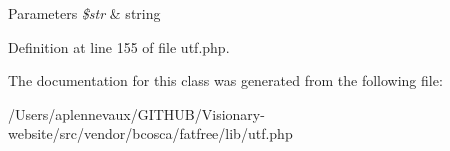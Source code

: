 \begin{DoxyParams}{Parameters}
{\em \$str} & string \\
\hline
\end{DoxyParams}


Definition at line 155 of file utf.\+php.



The documentation for this class was generated from the following file\+:\begin{DoxyCompactItemize}
\item 
/\+Users/aplennevaux/\+G\+I\+T\+H\+U\+B/\+Visionary-\/website/src/vendor/bcosca/fatfree/lib/utf.\+php\end{DoxyCompactItemize}
